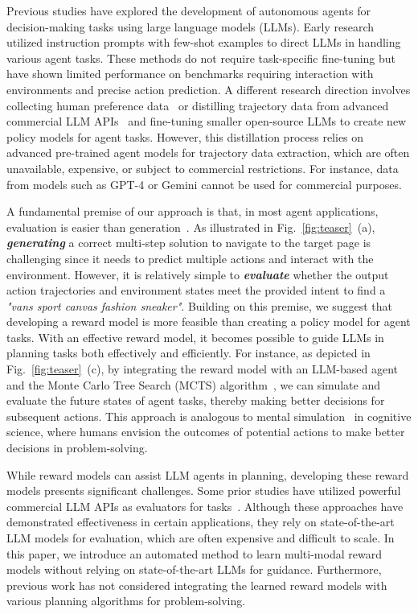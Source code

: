 Previous studies have explored the development of autonomous agents for decision-making tasks using large language models (LLMs). Early research~\citep{yao2023webshopscalablerealworldweb,zheng2024seeact,deng2024mind2web} utilized instruction prompts with few-shot examples to direct LLMs in handling various agent tasks. These methods do not require task-specific fine-tuning but have shown limited performance on benchmarks requiring interaction with environments and precise action prediction. A different research direction involves collecting human preference data~\citep{hong2023cogagent} or distilling trajectory data from advanced commercial LLM APIs~\citep{zeng2023agenttuning,deng2024mind2web} and fine-tuning smaller open-source LLMs to create new policy models for agent tasks. However, this distillation process relies on advanced pre-trained agent models for trajectory data extraction, which are often unavailable, expensive, or subject to commercial restrictions. For instance, data from models such as GPT-4 or Gemini cannot be used for commercial purposes.

A fundamental premise of our approach is that, in most agent applications, evaluation is easier than generation~\citep{karp1975computational,naor1996evaluation}. As illustrated in Fig.~\ref{fig:teaser}~(a), \textit{\textbf{generating}} a correct multi-step solution to navigate to the target page is challenging since it needs to predict multiple actions and interact with the environment. However, it is relatively simple to \textit{\textbf{evaluate}} whether the output action trajectories and environment states meet the provided intent to find a \textit{"vans sport canvas fashion sneaker"}. Building on this premise, we suggest that developing a reward model is more feasible than creating a policy model for agent tasks. With an effective reward model, it becomes possible to guide LLMs in planning tasks both effectively and efficiently. For instance, as depicted in Fig.~\ref{fig:teaser}~(c), by integrating the reward model with an LLM-based agent and the Monte Carlo Tree Search (MCTS) algorithm~\citep{silver2017mastering,coulom2006efficient}, we can simulate and evaluate the future states of agent tasks, thereby making better decisions for subsequent actions. This approach is analogous to mental simulation~\citep{hegarty2004mechanical,lake2017building} in cognitive science, where humans envision the outcomes of potential actions to make better decisions in problem-solving.%

While reward models can assist LLM agents in planning, developing these reward models presents significant challenges. Some prior studies have utilized powerful commercial LLM APIs as evaluators for tasks~\citep{kwon2023rewarddesignlanguagemodels}. Although these approaches have demonstrated effectiveness in certain applications, they rely on state-of-the-art LLM models for evaluation, which are often expensive and difficult to scale. In this paper, we introduce an automated method to learn multi-modal reward models without relying on state-of-the-art LLMs for guidance. Furthermore, previous work has not considered integrating the learned reward models with various planning algorithms for problem-solving.

